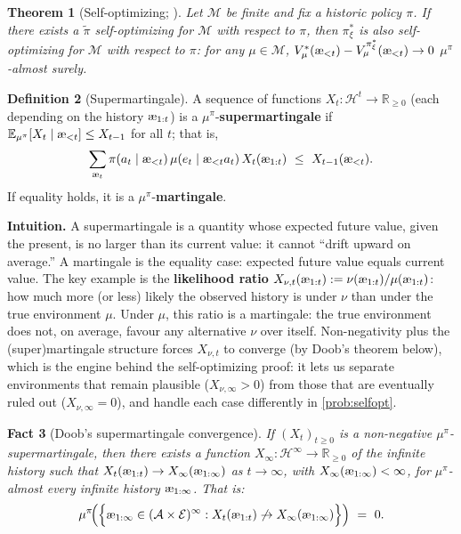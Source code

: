 \documentclass[fontsize=11pt, parskip=half]{scrartcl}
\newtheorem{theorem}{Theorem}[section]
\newtheorem{fact}[theorem]{Fact}
\theoremstyle{definition}
\newtheorem{definition}[theorem]{Definition}
\newcommand{\cA}{\mathcal{A}}
\newcommand{\cE}{\mathcal{E}}
\newcommand{\cH}{\mathcal{H}}
\newcommand{\cM}{\mathcal{M}}
\newcommand{\Ex}{\mathbb{E}}
\newcommand{\aes}{\textnormal{\ae}}
\begin{document}
\begin{theorem}[Self-optimizing; {\cite[Theorem 7.5.2]{Hutter:24uaibook2}}]\label{thm:selfopt}
Let $\cM$ be finite and fix a historic policy $\pi$.
If there exists a $\tilde\pi$ self-optimizing for $\cM$ with respect to $\pi$, then $\pi_\xi^*$ is also self-optimizing for $\cM$ with respect to $\pi$: for any $\mu \in \cM$,
$V_\mu^*(\aes_{<t}) - V_\mu^{\pi_\xi^*}(\aes_{<t}) \to 0$ $\mu^\pi$-almost surely.
\end{theorem}

\begin{definition}[Supermartingale]\label{def:supermartingale}
A sequence of functions $X_t : \cH^{t} \to \mathbb{R}_{\geq 0}$ (each depending on the history $\aes_{1:t}$) is a $\mu^\pi$-\textbf{supermartingale} if
$\Ex_{\mu^\pi}[X_t \mid \aes_{<t}] \leq X_{t-1}$ for all $t$; that is,
\[
    \sum_{\aes_t} \pi(a_t \mid \aes_{<t})\, \mu(e_t \mid \aes_{<t} a_t)\, X_t(\aes_{1:t}) ~\leq~ X_{t-1}(\aes_{<t}).
\]
If equality holds, it is a $\mu^\pi$-\textbf{martingale}.
\end{definition}

\textbf{Intuition.}
A supermartingale is a quantity whose expected future value, given the present, is no larger than its current value: it cannot ``drift upward on average.'' A martingale is the equality case: expected future value equals current value.
The key example is the \textbf{likelihood ratio} $X_{\nu,t}(\aes_{1:t}) := \nu(\aes_{1:t})/\mu(\aes_{1:t})$: how much more (or less) likely the observed history is under $\nu$ than under the true environment $\mu$.
Under $\mu$, this ratio is a martingale: the true environment does not, on average, favour any alternative $\nu$ over itself.
Non-negativity plus the (super)martingale structure forces $X_{\nu,t}$ to converge (by Doob's theorem below), which is the engine behind the self-optimizing proof: it lets us separate environments that remain plausible ($X_{\nu,\infty} > 0$) from those that are eventually ruled out ($X_{\nu,\infty} = 0$), and handle each case differently in \cref{prob:selfopt}.

\begin{fact}[Doob's supermartingale convergence]\label{fact:doob}
If $(X_t)_{t \geq 0}$ is a non-negative $\mu^\pi$-supermartingale, then there exists a function $X_\infty : \cH^\infty \to \mathbb{R}_{\geq 0}$ of the infinite history such that $X_t(\aes_{1:t}) \to X_\infty(\aes_{1:\infty})$ as $t \to \infty$, with $X_\infty(\aes_{1:\infty}) < \infty$, for $\mu^\pi$-almost every infinite history $\aes_{1:\infty}$.
That is:
\[
    \mu^\pi\!\Big(\Big\{\aes_{1:\infty} \in (\cA \times \cE)^\infty : X_t(\aes_{1:t}) \not\to X_\infty(\aes_{1:\infty})\Big\}\Big) ~=~ 0.
\]
\end{fact}
\end{document}
